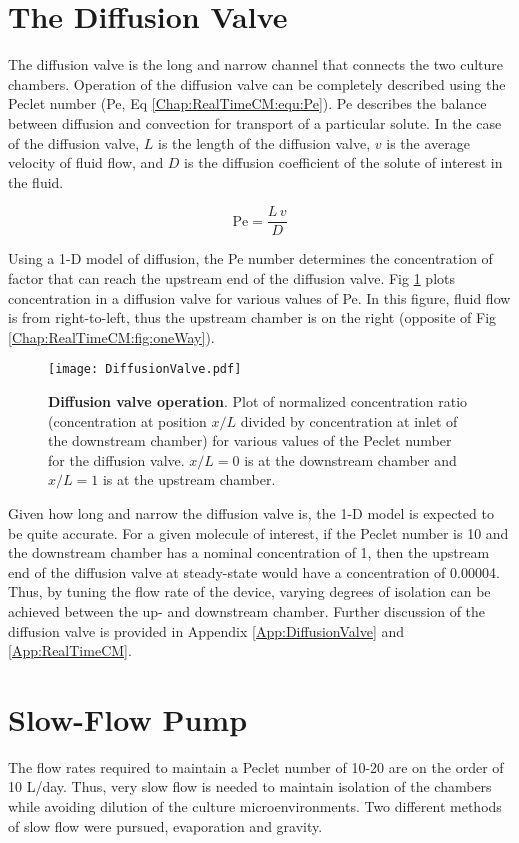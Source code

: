 \section{The Diffusion Valve}
The diffusion valve is the long and narrow channel that connects the two culture chambers. Operation of the diffusion valve can be completely described using the Peclet number (Pe, Eq \ref{Chap:RealTimeCM:equ:Pe}). Pe describes the balance between diffusion and convection for transport of a particular solute. In the case of the diffusion valve, $L$ is the length of the diffusion valve, $v$ is the average velocity of fluid flow, and $D$ is the diffusion coefficient of the solute of interest in the fluid.

\begin{equation}
\textrm{Pe} = \frac{L\,v}{D}
\label{Chap:RealTimeCM:equ:Pe}
\end{equation}
 
Using a 1-D model of diffusion, the Pe number determines the concentration of factor that can reach the upstream end of the diffusion valve. Fig \ref{Chap:RealTimeCM:fig:Pe} plots concentration in a diffusion valve for various values of Pe. In this figure, fluid flow is from right-to-left, thus the upstream chamber is on the right (opposite of Fig \ref{Chap:RealTimeCM:fig:oneWay}).

\begin{figure}[!ht]
\centering
\texttt{[image: DiffusionValve.pdf]}
\caption{\textbf{Diffusion valve operation}. Plot of normalized concentration ratio (concentration at position $x/L$ divided by concentration at inlet of the downstream chamber) for various values of the Peclet number for the diffusion valve. $x/L=0$ is at the downstream chamber and $x/L=1$ is at the upstream chamber.}
\label{Chap:RealTimeCM:fig:Pe}
\end{figure}

Given how long and narrow the diffusion valve is, the 1-D model is expected to be quite accurate. For a given molecule of interest, if the Peclet number is 10 and the downstream chamber has a nominal concentration of 1, then the upstream end of the diffusion valve at steady-state would have a concentration of 0.00004. Thus, by tuning the flow rate of the device, varying degrees of isolation can be achieved between the up- and downstream chamber. Further discussion of the diffusion valve is  provided in Appendix \ref{App:DiffusionValve} and \ref{App:RealTimeCM}.

\section{Slow-Flow Pump}
The flow rates required to maintain a Peclet number of 10-20 are on the order of 10 \textmu L/day. Thus, very slow flow is needed to maintain isolation of the chambers while avoiding dilution of the culture microenvironments. Two different methods of slow flow were pursued, evaporation and gravity.

